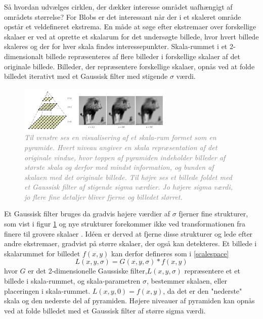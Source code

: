        \vspace{-2.5em}
\noindent
Så hvordan udvælges cirklen, der dækker interesse området uafhængigt af områdets størrelse?  For Blobs er det interessant når der i et skaleret område opstår et veldefineret ekstrema. En måde at søge efter ekstremaer over forskellige skalaer er ved at oprette et skalarum for det undersøgte billede, hvor hvert billede skaleres og der for hver skala findes interessepunkter. Skala-rummet i et 2-dimensionalt billede repræsenteres af flere billeder i forskellige skalaer af det originale billede. Billeder, der repræsentere forskellige skalaer, opnås ved at folde billedet iterativt med et Gaussisk filter med stigende $\sigma$ værdi. 
\begin{figure}[H]
    \centering
    \includegraphics[width=0.65\textwidth]{fig/24.png}
    \vspace{-0.5em}   
    \begin{center}
    \caption{\textcolor{gray}{\footnotesize \textit{
Til venstre ses en visualisering af et skala-rum formet som en pyramide. Hvert niveau angiver en skala repræsentation af det originale vindue, hvor toppen af pyramiden indeholder billeder af største skala og derfor med mindst information, og bunden af skalaen med det originale billede. Til højre ses et billede foldet med et Gaussisk filter af stigende sigma værdier. Jo højere sigma værdi, jo flere fine detaljer bliver fjerne og billedet slørret.
    }}}
    \label{fig:mona}
     \end{center}
  \end{figure}
       \vspace{-2.5em}
\noindent
Et Gaussisk filter bruges da gradvis højere værdier af $\sigma$ fjerner fine strukturer, som vist i figur \ref{fig:mona} og nye strukturer forekommer ikke ved transformationen fra finere til grovere skalaer \cite{lindenscale}. Idéen er derved at fjerne disse strukturer og lede efter  andre ekstremaer, gradvist på større skalaer, der også kan detekteres.
Et billede i skalarummet for billedet $f(x,y)$ kan derfor defineres som i \eqref{scalespace}
\begin{equation}
L(x,y,\sigma) = G(x,y,\sigma)\ast f(x,y)
\label{scalespace}
\end{equation}
hvor $G$ er det 2-dimensionelle Gaussiske filter,$L(x,y,\sigma)$ repræsentere et et billede i skala-rummet, og skala-parametren $\sigma$, bestemmer skalaen, eller placeringen i skala-rummet. $L(x,y,0) = f(x,y)$, da det er den "nederste" skala og den nederste del af pyramiden. Højere niveauer af pyramiden kan opnås ved at folde billedet med et Gaussisk filter af større sigma værdi.